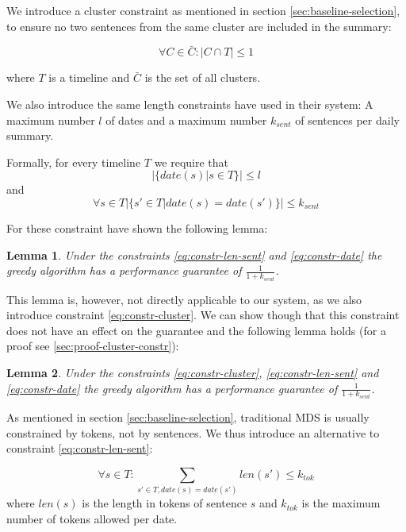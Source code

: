\documentclass[a4paper,BCOR=10mm]{report}
\newtheorem{lemma}{Lemma}
\numberwithin{lemma}{chapter}
\numberwithin{definition}{chapter}
\begin{document}
We introduce a cluster constraint as mentioned in section \ref{sec:baseline-selection}, to ensure no two sentences from the same cluster are included in the summary:

\begin{equation}
\forall C \in \bar{C} \label{eq:constr-cluster}: |C \cap T| \leq 1
\end{equation}

where $T$ is a timeline and $\bar{C}$ is the set of all clusters.

We also introduce the same length constraints \citet{markert} have used in their system: A maximum number $l$ of dates and a maximum number $k_{\mathit{sent}}$ of sentences per daily summary. 

Formally, for every timeline $T$ we require that
\begin{equation}
|\{ \mathit{date}(s) | s \in T \}| \leq l \label{eq:constr-date}
\end{equation}
and
\begin{equation}
\forall s \in T |\{ s' \in T | \mathit{date}(s) = \mathit{date}(s') \}| \leq k_{\mathit{sent}} \label{eq:constr-len-sent}
\end{equation}

For these constraint \citet{markert} have shown the following lemma:
\begin{lemma}
Under the constraints \ref{eq:constr-len-sent} and \ref{eq:constr-date} the greedy algorithm has a performance guarantee of $\frac{1}{1 + k_{\mathit{sent}}}$.
\end{lemma}

This lemma is, however, not directly applicable to our system, as we also introduce constraint \ref{eq:constr-cluster}. We can show though that this constraint does not have an effect on the guarantee and the following lemma holds (for a proof see \ref{sec:proof-cluster-constr}):
\begin{lemma}
Under the constraints \ref{eq:constr-cluster}, \ref{eq:constr-len-sent} and \ref{eq:constr-date} the greedy algorithm has a performance guarantee of $\frac{1}{1 + k_{\mathit{sent}}}$.
\end{lemma}

As mentioned in section \ref{sec:baseline-selection}, traditional MDS is usually constrained by tokens, not by sentences.
We thus introduce an alternative to constraint \ref{eq:constr-len-sent}:

\begin{equation}
\forall s \in T: \sum_{s' \in T, \mathit{date}(s) = \mathit{date}(s')} \mathit{len}(s') \leq k_{\mathit{tok}} \label{eq:constr-len-tok}
\end{equation}
where $\mathit{len}(s)$ is the length in tokens of sentence $s$ and $k_{\mathit{tok}}$ is the maximum number of tokens allowed per date.
\end{document}

